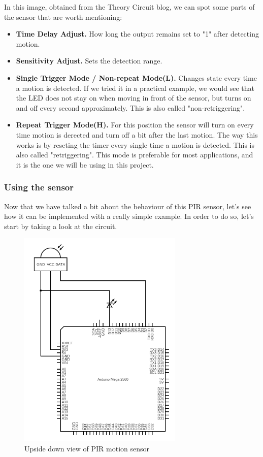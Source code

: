 In this image, obtained from the Theory Circuit\cite{theory-circuit} blog, we can spot some parts of the sensor that are worth mentioning:

\begin{itemize}
	\item \textbf{Time Delay Adjust.} How long the output remains set to "1" after detecting motion.
	\item \textbf{Sensitivity Adjust.} Sets the detection range.
	\item \textbf{Single Trigger Mode / Non-repeat Mode(L).} Changes state every time a motion is detected. If we tried it in a practical example, we would see that the LED does not stay on when moving in front of the sensor, but turns on and off every second approximately. This is also called "non-retriggering". 
	\item \textbf{Repeat Trigger Mode(H).} For this position the sensor will turn on every time motion is derected and turn off a bit after the last motion. The way this works is by reseting the timer every single time a motion is detected. This is also called "retriggering". This mode is preferable for most applications, and it is the one we will be using in this project.
\end{itemize}

\subsubsection{Using the sensor}
Now that we have talked a bit about the behaviour of this PIR sensor, let's see how it can be implemented with a really simple example. In order to do so, let's start by taking a look at the circuit.

\begin{figure}[H]
    \centering
    \includegraphics[width=0.7\textwidth]{fig/pir-scheme-circuit.png}
    \caption{Upside down view of PIR motion sensor}
    \label{fig:pir-scheme-circuit}
\end{figure}

